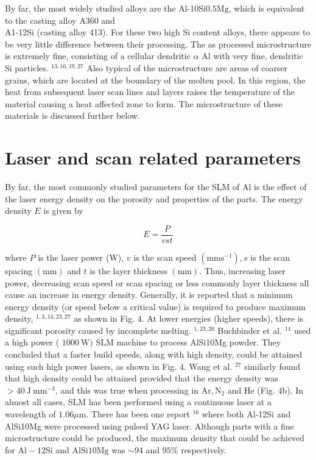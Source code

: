 \documentclass[10pt]{article}
\begin{document}
By far, the most widely studied alloys are the Al-10Si$0.5 \mathrm{Mg}$, which is equivalent to the casting alloy A360 and\\
A1-12Si (casting alloy 413). For these two high Si content alloys, there appears to be very little difference between their processing. The as processed microstructure is extremely fine, consisting of a cellular dendritic $\alpha$ Al with very fine, dendritic Si particles. ${ }^{13,16,19,27}$ Also typical of the microstructure are areas of coarser grains, which are located at the boundary of the molten pool. In this region, the heat from subsequent laser scan lines and layers raises the temperature of the material causing a heat affected zone to form. The microstructure of these materials is discussed further below.

\section*{Laser and scan related parameters}
By far, the most commonly studied parameters for the SLM of $\mathrm{Al}$ is the effect of the laser energy density on the porosity and properties of the parts. The energy density $E$ is given by


\begin{equation*}
E=\frac{P}{v s t} \tag{5}
\end{equation*}


where $P$ is the laser power (W), $v$ is the scan speed $\left(\mathrm{mm} \mathrm{s}^{-1}\right), s$ is the scan spacing $(\mathrm{mm})$ and $t$ is the layer thickness $(\mathrm{mm})$. Thus, increasing laser power, decreasing scan speed or scan spacing or less commonly layer thickness all cause an increase in energy density. Generally, it is reported that a minimum energy density (or speed below a critical value) is required to produce maximum density, ${ }^{1,3,14,23,27}$ as shown in Fig. 4. At lower energies (higher speeds), there is significant porosity caused by incomplete melting. ${ }^{1,23,26}$ Buchbinder et al. ${ }^{14}$ used a high power ( $1000 \mathrm{~W})$ SLM machine to process AlSi10Mg powder. They concluded that a faster build speeds, along with high density, could be attained using such high power lasers, as shown in Fig. 4. Wang et al. ${ }^{27}$ similarly found that high density could be attained provided that the energy density was $>40 \mathrm{~J} \mathrm{~mm}^{-3}$, and this was true when processing in $\mathrm{Ar}, \mathrm{N}_{2}$ and $\mathrm{He}$ (Fig. 4b). In almost all cases, SLM has been performed using a continuous laser at a wavelength of $1.06 \mu \mathrm{m}$. There has been one report ${ }^{16}$ where both Al-12Si and AlSi10Mg were processed using pulsed YAG laser. Although parts with a fine microstructure could be produced, the maximum density that could be achieved for $\mathrm{Al}-12 \mathrm{Si}$ and $\mathrm{AlSi10Mg}$ was $\sim 94$ and $95 \%$ respectively.
\end{document}
